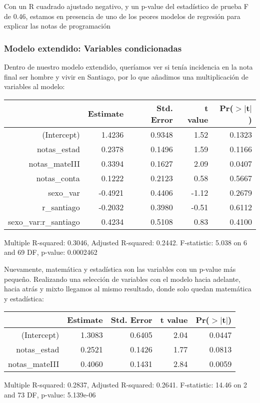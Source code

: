 \documentclass[11pt]{article}
\begin{document}
Con un R cuadrado ajustado negativo, y un p-value del estadístico de prueba F de 0.46, estamos en presencia de uno de los peores modelos de regresión para explicar las notas de programación

\newpage
\subsubsection{Modelo extendido: Variables condicionadas}

Dentro de nuestro modelo extendido, queríamos ver si tenía incidencia en la nota final ser hombre y vivir en Santiago, por lo que añadimos una multiplicación de variables al modelo:

\begin{center}
\begin{table}[ht]
\centering
\begin{tabular}{rrrrr}
  \hline
 & Estimate & Std. Error & t value & Pr($>$$|$t$|$) \\ 
  \hline
(Intercept) & 1.4236 & 0.9348 & 1.52 & 0.1323 \\ 
  notas\_estad & 0.2378 & 0.1496 & 1.59 & 0.1166 \\ 
  notas\_mateIII & 0.3394 & 0.1627 & 2.09 & 0.0407 \\ 
  notas\_conta & 0.1222 & 0.2123 & 0.58 & 0.5667 \\ 
  sexo\_var & -0.4921 & 0.4406 & -1.12 & 0.2679 \\ 
  r\_santiago & -0.2032 & 0.3980 & -0.51 & 0.6112 \\ 
  sexo\_var:r\_santiago & 0.4234 & 0.5108 & 0.83 & 0.4100 \\ 
   \hline
\end{tabular}
\end{table}
\tiny{Multiple R-squared: 0.3046, Adjusted R-squared: 0.2442.
F-statistic: 5.038 on 6 and 69 DF, p-value: 0.0002462}
\end{center}

Nuevamente, matemática y estadística son las variables con un p-value más pequeño. Realizando una selección de variables con el modelo hacia adelante, hacia atrás y mixto llegamos al mismo resultado, donde solo quedan matemática y estadística:

\begin{center}
\begin{table}[ht]
\begin{center}
\begin{tabular}{rrrrr}
  \hline
 & Estimate & Std. Error & t value & Pr($>$$|$t$|$) \\ 
  \hline
(Intercept) & 1.3083 & 0.6405 & 2.04 & 0.0447 \\ 
  notas\_estad & 0.2521 & 0.1426 & 1.77 & 0.0813 \\ 
  notas\_mateIII & 0.4060 & 0.1431 & 2.84 & 0.0059 \\ 
   \hline
\end{tabular}
\end{center}
\end{table}

\tiny{Multiple R-squared: 0.2837, Adjusted R-squared: 0.2641.
F-statistic: 14.46 on 2 and 73 DF, p-value: 5.139e-06}
\end{center}
\end{document}

